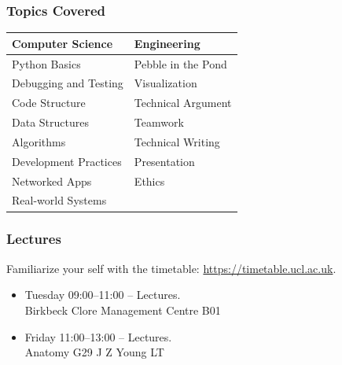 \documentclass{beamer} %
\begin{document}
\begin{frame}
\frametitle{Topics Covered} 

\begin{center}
\begin{tabular}{ l l }
  \hline
  Computer Science & Engineering \\
  \hline
  Python Basics & Pebble in the Pond\\
  Debugging and Testing & Visualization\\
  Code Structure & Technical Argument\\
  Data Structures & Teamwork \\
  Algorithms & Technical Writing\\
  Development Practices & Presentation\\
  Networked Apps & Ethics\\
  Real-world Systems\\
  \hline
\end{tabular}
\end{center}

\end{frame}

\begin{frame}
\frametitle{Lectures} 

Familiarize your self with the timetable: \url{https://timetable.ucl.ac.uk}.

\begin{itemize}
\item Tuesday 09:00--11:00 -- Lectures.\\
Birkbeck Clore Management Centre B01
\item Friday 11:00--13:00 -- Lectures.\\
Anatomy G29 J Z Young LT
\end{itemize}
\end{frame}
\end{document}
